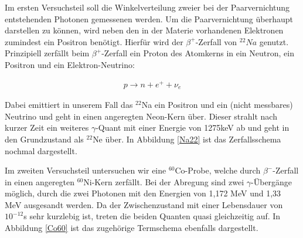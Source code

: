 \documentclass[11pt]{scrartcl}
\begin{document}
Im ersten Versuchsteil soll die Winkelverteilung zweier bei der Paarvernichtung entstehenden Photonen gemessenen werden. Um die Paarvernichtung überhaupt darstellen zu können, wird neben den in der Materie vorhandenen Elektronen zumindest ein Positron benötigt. Hierfür wird der $\beta^+$-Zerfall von $^{22}Na$ genutzt. Prinzipiell zerfällt beim $\beta^+$-Zerfall ein Proton des Atomkerns in ein Neutron, ein Positron und ein Elektron-Neutrino:

\begin{align}
p \rightarrow n + e^+ + \nu_e
\end{align}

Dabei emittiert in unserem Fall das $^{22}$Na  ein Positron und ein (nicht messbares) Neutrino und geht in einen angeregten Neon-Kern über. Dieser strahlt nach kurzer Zeit ein weiteres $\gamma$-Quant mit einer Energie von 1275keV ab und geht in den Grundzustand als $^{22}$Ne über. In Abbildung \ref{Na22} ist das Zerfallsschema nochmal dargestellt.

Im zweiten Versuchsteil untersuchen wir eine $^{60}$Co-Probe, welche durch $\beta^-$-Zerfall in einen angeregten $^{60}$Ni-Kern zerfällt. Bei der Abregung sind zwei $\gamma$-Übergänge möglich, durch die zwei Photonen mit den Energien von 1,172 MeV und 1,33 MeV ausgesandt werden. Da der Zwischenzustand mit einer Lebensdauer  von $10^{-12}$s sehr kurzlebig ist, treten die beiden Quanten quasi gleichzeitig auf. In Abbildung \ref{Co60} ist das zugehörige Termschema ebenfalls dargestellt.
\end{document}
